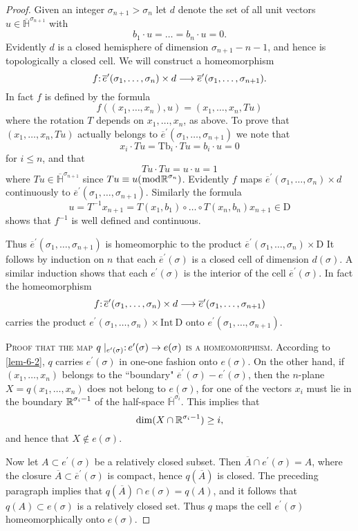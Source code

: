 \begin{proof}
Given an integer $\sigma_{n+1}>\sigma_{n}$ let $d$ denote the set of all unit vectors $u \in \overline{\mathbb{H}}^{\sigma_{n+1}}$ with
\[
b_{1} \cdot u=\dots=b_{n} \cdot u=0.
\]
Evidently $d$ is a closed hemisphere of dimension $\sigma_{n+1}-n-1$, and hence is topologically a closed cell. We will construct a homeomorphism
\[\map{f}{\overline{e}^{\prime}(\sigma_{1},\dots, \sigma_{n}) \times d}{\overline{e}^{\prime}(\sigma_{1},\dots, \sigma_{n+1})}.
\]
In fact $f$ is defined by the formula
\[
f((x_{1},\dots, x_{n}), u)=(x_{1},\dots, x_{n}, Tu)
\]
where the rotation $T$ depends on $x_{1},\dots, x_{n}$, as above. To prove that $(x_{1},\dots, x_{n}, Tu)$ actually belongs to $\overline{e}^{\prime}(\sigma_{1},\dots, \sigma_{n+1})$ we note that
\[
x_{i} \cdot Tu=\mathrm{Tb}_{i} \cdot Tu=b_{i} \cdot u=0
\]
for $i \leq n$, and that
\[
Tu \cdot Tu=u \cdot u=1
\]
where $Tu \in \overline{\mathbb{H}}^{\sigma_{n+1}}$ since $Tu \equiv u(\bmod \boldsymbol{\mathbb{R}}^{\sigma_{n}})$. Evidently $f$ maps $\overline{e}^{\prime}(\sigma_{1},\dots, \sigma_{n}) \times d$ continuously to $\overline{e}^{\prime}(\sigma_{1},\dots, \sigma_{n+1}) $. Similarly the formula
\[
u=T^{-1} x_{n+1}=T(x_{1}, b_{1}) \circ\dots \circ T(x_{n}, b_{n}) x_{n+1} \in \mathrm{D}
\]
shows that $f^{-1}$ is well defined and continuous.

Thus $\overline{e}^{\prime}(\sigma_{1},\dots, \sigma_{n+1})$ is homeomorphic to the product $\overline{e}^{\prime}(\sigma_{1},\dots, \sigma_{n}) \times \mathrm{D}$ It follows by induction on $n$ that each $\overline{e}^{\prime}(\sigma)$ is a closed cell of dimension $d(\sigma) $. A similar induction shows that each $e^{\prime}(\sigma)$ is the interior of the cell $\overline{e}^{\prime}(\sigma) $. In fact the homeomorphism
\[
\map{f} {\overline{e}^{\prime}(\sigma_{1},\dots, \sigma_{n}) \times d}{\overline{e}^{\prime}(\sigma_{1},\dots, \sigma_{n+1})}
\]
carries the product $e^{\prime}(\sigma_{1},\dots, \sigma_{n}) \times \mathrm{Int\ D}$ onto $e^{\prime}(\sigma_{1},\dots, \sigma_{n+1})$.

\noindent\textsc{Proof that the map}
$
\map{q\mid_ {e^{\prime}(\sigma)}}{ e^{\prime}(\sigma)}{e(\sigma)}
$
\textsc{is a homeomorphism.} According to \cref{lem-6-2}, $q$ carries $e^{\prime}(\sigma)$ in one-one fashion onto $e(\sigma) $. On the other hand, if $(x_{1},\dots, x_{n})$ belongs to the ``boundary" $\overline{e}^{\prime}(\sigma)-e^{\prime}(\sigma)$, then the $n$-plane $X=q(x_{1},\dots, x_{n})$ does not belong to $e(\sigma)$, for one of the vectors $x_{i}$ must lie in the boundary $\boldsymbol{\mathbb{R}}^{\sigma_{i}-1}$ of the half-space $\overline{\mathbb{H}}^{\sigma_{i}}$. This implies that
\[
\dim(X \cap \boldsymbol{\mathbb{R}}^{\sigma_{i}-1}) \geq i,
\]
and hence that $X \notin e(\sigma)$.

Now let $A \subset e^{\prime}(\sigma)$ be a relatively closed subset. Then $\overline{A} \cap e^{\prime}(\sigma)=A$, where the closure $\overline{A} \subset \overline{e}^{\prime}(\sigma)$ is compact, hence $q(\overline{A})$ is closed. The preceding paragraph implies that $q(\overline{A}) \cap e(\sigma)=q(A)$, and it follows that $q(A) \subset e(\sigma)$ is a relatively closed set. Thus $q$ maps the cell $e^{\prime}(\sigma)$ homeomorphically onto $e(\sigma)$.
\end{proof}

